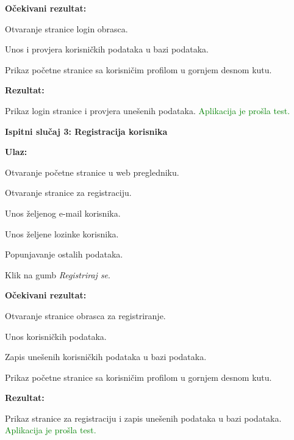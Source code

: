  			\textnormal{\textbf{Očekivani rezultat:}}
 			
 			\begin{packed_enum}
 				\item Otvaranje stranice login obrasca.
 				\item Unos i provjera korisničkih podataka u bazi podataka.
 				\item Prikaz početne stranice sa korisničim profilom u gornjem desnom kutu.
 			\end{packed_enum}
 			
 			\textnormal{\textbf{Rezultat:}}
 			
 			\textnormal{Prikaz login stranice i provjera unešenih podataka. \textcolor{green}{Aplikacija je prošla test.}\\}
 			
 			\textnormal{\textbf{Ispitni slučaj 3: Registracija korisnika}\\}
 			
 			\textnormal{\textbf{Ulaz:}}
 			
 			\begin{packed_enum}
 				\item Otvaranje početne stranice u web pregledniku.
 				\item Otvaranje stranice za registraciju.
 				\item Unos željenog e-mail korisnika.
 				\item Unos željene lozinke korisnika.
 				\item Popunjavanje ostalih podataka.
 				\item Klik na gumb \textit{Registriraj se}.
 			\end{packed_enum}
 			
 			\textnormal{\textbf{Očekivani rezultat:}}
 			
 			\begin{packed_enum}
 				\item Otvaranje stranice obrasca za registriranje.
 				\item Unos korisničkih podataka.
 				\item Zapis unešenih korisničkih podataka u bazi podataka.
 				\item Prikaz početne stranice sa korisničim profilom u gornjem desnom kutu.
 			\end{packed_enum}
 			
 			\textnormal{\textbf{Rezultat:}}
 			
 			\textnormal{Prikaz stranice za registraciju i zapis unešenih podataka u bazi podataka. \textcolor{green}{Aplikacija je prošla test.}\\}
 			
